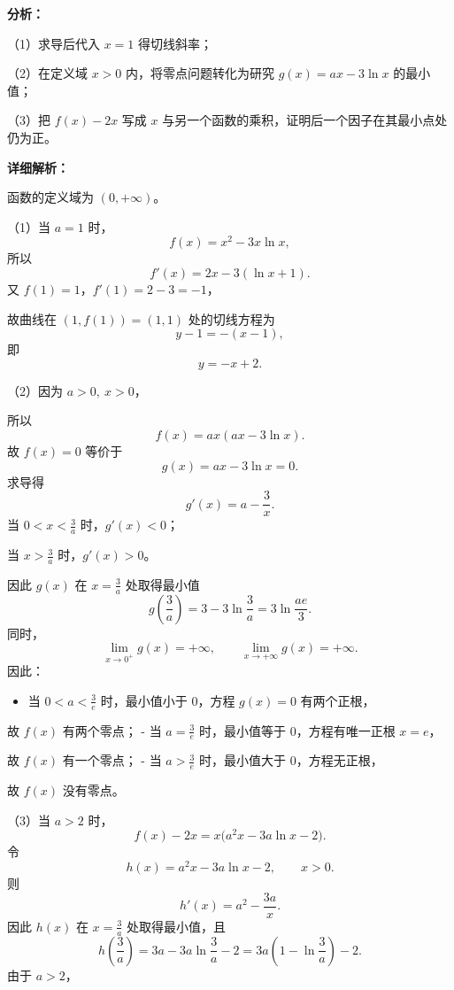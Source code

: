 \documentclass[UTF8,12pt,a4paper]{ctexart}
\providecommand{\tightlist}{%
  \setlength{\itemsep}{0pt}\setlength{\parskip}{0pt}}
\begin{document}
\textbf{分析：}


\par\smallskip\noindent（1）求导后代入 \(x=1\) 得切线斜率；
\par\smallskip\noindent（2）在定义域 \(x>0\) 内，将零点问题转化为研究 \(g(x)=ax-3\ln x\) 的最小值；
\par\smallskip\noindent（3）把 \(f(x)-2x\) 写成 \(x\) 与另一个函数的乘积，证明后一个因子在其最小点处仍为正。

\textbf{详细解析：}

函数的定义域为 \((0,+\infty)\)。


\par\smallskip\noindent（1）当 \(a=1\) 时，
\[
   f(x)=x^2-3x\ln x,
   \]
所以
\[
   f'(x)=2x-3(\ln x+1).
   \]
又 \(f(1)=1\)，\(f'(1)=2-3=-1\)，

故曲线在 \((1,f(1))=(1,1)\) 处的切线方程为
\[
   y-1=-(x-1),
   \]
即
\[
   \boxed{y=-x+2}.
   \]


\par\smallskip\noindent（2）因为 \(a>0,\ x>0\)，

所以
\[
   f(x)=ax(ax-3\ln x).
   \]
故 \(f(x)=0\) 等价于
\[
   g(x)=ax-3\ln x=0.
   \]
求导得
\[
   g'(x)=a-\frac3x.
   \]
当 \(0<x<\frac3a\) 时，\(g'(x)<0\)；

当 \(x>\frac3a\) 时，\(g'(x)>0\)。

因此 \(g(x)\) 在 \(x=\frac3a\) 处取得最小值
\[
   g\left(\frac3a\right)
   =3-3\ln\frac3a
   =3\ln\dfrac{ae}{3}.
   \]
同时，
\[
   \lim_{x\to0^+}g(x)=+\infty,\qquad
   \lim_{x\to+\infty}g(x)=+\infty.
   \]
因此：

\begin{itemize}
\tightlist
\item
  当 \(0<a<\frac3e\) 时，最小值小于 \(0\)，方程 \(g(x)=0\) 有两个正根，
\end{itemize}

故 \(f(x)\) 有两个零点；
- 当 \(a=\frac3e\) 时，最小值等于 \(0\)，方程有唯一正根 \(x=e\)，

故 \(f(x)\) 有一个零点；
- 当 \(a>\frac3e\) 时，最小值大于 \(0\)，方程无正根，

故 \(f(x)\) 没有零点。


\par\smallskip\noindent（3）当 \(a>2\) 时，
\[
   f(x)-2x
   =x\bigl(a^2x-3a\ln x-2\bigr).
   \]
令
\[
   h(x)=a^2x-3a\ln x-2,\qquad x>0.
   \]
则
\[
   h'(x)=a^2-\dfrac{3a}{x}.
   \]
因此 \(h(x)\) 在 \(x=\frac3a\) 处取得最小值，且
\[
   h\left(\frac3a\right)
   =3a-3a\ln\frac3a-2
   =3a\left(1-\ln\frac3a\right)-2.
   \]
由于 \(a>2\)，
\end{document}
